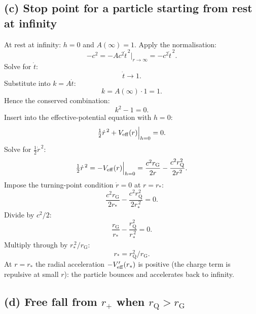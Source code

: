 \documentclass[11pt]{article}
\newcommand{\rG}{r_{\mathrm{G}}}
\newcommand{\rQ}{r_{\mathrm{Q}}}
\begin{document}
\subsection*{(c) Stop point for a particle starting from rest at infinity}

At rest at infinity: $h=0$ and $A(\infty)=1$. Apply the normalisation:
\[
-c^2=-Ac^2\dot t^{\,2}\Big|_{r\to\infty}=-c^2\dot t^{\,2}.
\]
Solve for $\dot t$:
\[
\dot t\to 1.
\]
Substitute into $k=A\dot t$:
\[
k=A(\infty)\cdot 1=1.
\]
Hence the conserved combination:
\[
k^2-1=0.
\]
Insert into the effective-potential equation with $h=0$:
\[
\tfrac12 \dot r^{\,2}+V_{\rm eff}(r)\Big|_{h=0}=0.
\]
Solve for $\tfrac12\dot r^{\,2}$:
\[
\tfrac12 \dot r^{\,2}=-V_{\rm eff}(r)\Big|_{h=0}=\frac{c^2\rG}{2r}-\frac{c^2\rQ^2}{2r^2}.
\]
Impose the turning-point condition $\dot r=0$ at $r=r_*$:
\[
\frac{c^2\rG}{2r_*}-\frac{c^2\rQ^2}{2r_*^{\,2}}=0.
\]
Divide by $c^2/2$:
\[
\frac{\rG}{r_*}-\frac{\rQ^2}{r_*^{\,2}}=0.
\]
Multiply through by $r_*^{\,2}/\rG$:
\begin{equation}
\boxed{\ r_*=\rQ^2/\rG.\ }
\label{eq:rstar}
\end{equation}
At $r=r_*$ the radial acceleration $-V'_{\rm eff}(r_*)$ is positive (the charge term is repulsive at small $r$): the particle bounces and accelerates back to infinity.

\subsection*{(d) Free fall from $r_+$ when $\rQ>\rG$}
\end{document}

